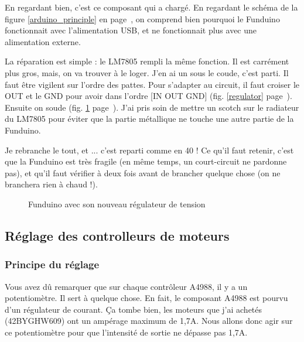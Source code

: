 En regardant bien, c'est ce composant qui a chargé. %
En regardant le schéma de la figure \ref{arduino_principle} en page~\pageref{arduino_principle}, %
on comprend bien pourquoi le Funduino fonctionnait avec l'alimentation USB, et ne %
fonctionnait plus avec une alimentation externe. \par%
La réparation est simple : le LM7805 rempli la même fonction. Il est carrément plus gros, %
mais, on va trouver à le loger. J'en ai un sous le coude, c'est parti. Il faut être %
vigilent sur l'ordre des pattes. Pour s'adapter au circuit, il faut croiser le OUT %
et le GND pour avoir dans l'ordre [IN OUT GND] (fig. \ref{regulator} page~\pageref{regulator}). Ensuite on soude (fig. \ref{funduino_repared} %
page~\pageref{funduino_repared}). J'ai pris soin de mettre un scotch sur le radiateur du %
LM7805 pour éviter que la partie métallique ne touche une autre partie de la Funduino.\par{} %
Je rebranche le tout, et ... c'est reparti comme en 40 ! Ce qu'il faut retenir, c'est %
que la Funduino est très fragile (en même temps, un court-circuit ne pardonne pas), %
et qu'il faut vérifier à deux fois avant de brancher quelque chose (on ne branchera %
rien à chaud !).%
\begin{figure}%
   \caption{\label{funduino_repared} Funduino avec son nouveau régulateur de tension}%
\end{figure}%
\subsection{Réglage des controlleurs de moteurs}
\subsubsection{Principe du réglage}
Vous avez dû remarquer que sur chaque contrôleur A4988, il y a un potentiomètre. Il sert %
à quelque chose. En fait, le composant A4988 est pourvu d'un régulateur de courant. \c{C}a tombe %
bien, les moteurs que j'ai achetés (42BYGHW609) ont un ampérage maximum de 1,7A. Nous allons %
donc agir sur ce potentiomètre pour que l'intensité de sortie ne dépasse pas 1,7A.
